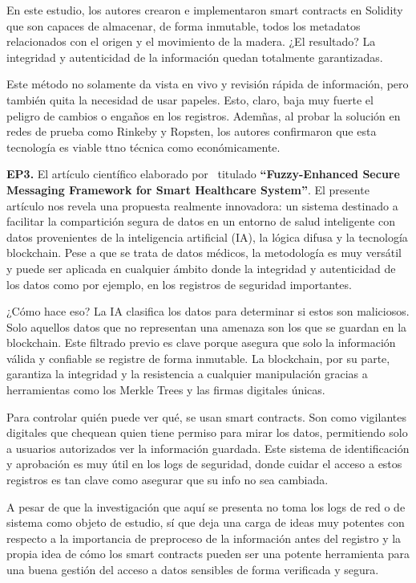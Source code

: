 En este estudio, los autores crearon e implementaron smart contracts en Solidity que son capaces de almacenar, de forma inmutable, todos los metadatos relacionados con el origen y el movimiento de la madera. ¿El resultado? La integridad y autenticidad de la información quedan totalmente garantizadas.

Este método no solamente da vista en vivo y revisión rápida de información, pero también quita la necesidad de usar papeles. Esto, claro, baja muy fuerte el peligro de cambios o engaños en los registros. Ademñas, al probar la solución en redes de prueba como Rinkeby y Ropsten, los autores confirmaron que esta tecnología es viable ttno técnica como económicamente.


\textbf{EP3.}  El artículo científico elaborado por~\cite{Patel2024FuzzyEnhanced}  titulado \textbf{“Fuzzy-Enhanced Secure Messaging Framework for Smart Healthcare System”}.  El presente artículo nos revela una propuesta realmente innovadora: un sistema destinado a facilitar la compartición segura de datos en un entorno de salud inteligente con datos provenientes de la inteligencia artificial (IA), la lógica difusa y la tecnología blockchain. Pese a que se trata de datos médicos, la metodología es muy versátil y puede ser aplicada en cualquier ámbito donde la integridad y autenticidad de los datos  como por ejemplo, en los registros de seguridad importantes. 

¿Cómo hace eso? La IA clasifica los datos para determinar si estos son maliciosos. Solo aquellos datos que no representan una amenaza son los que se guardan en la blockchain. Este filtrado previo es clave porque asegura que solo la información válida y confiable se registre de forma inmutable. La blockchain, por su parte, garantiza la integridad y la resistencia a cualquier manipulación gracias a herramientas como los Merkle Trees y las firmas digitales únicas.

Para controlar quién puede ver qué, se usan smart contracts. Son como vigilantes digitales que chequean quien tiene permiso para mirar los datos, permitiendo solo a usuarios autorizados ver la información guardada. Este sistema de identificación y aprobación es muy útil en los logs de seguridad, donde cuidar el acceso a estos registros es tan clave como asegurar que su info no sea cambiada. 

A pesar de que la investigación que aquí se presenta no toma los logs de red o de sistema como objeto de estudio, sí que deja una carga de ideas muy potentes con respecto a la importancia de preproceso de la información antes del registro y la propia idea de cómo los smart contracts pueden ser  una potente herramienta para una buena gestión del acceso a datos sensibles de forma verificada y segura.

